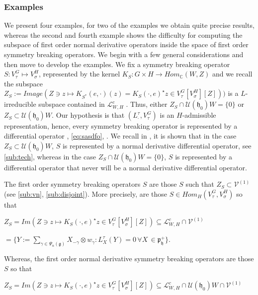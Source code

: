 \documentclass[12pt]{amsart}
\theoremstyle{definition}
\theoremstyle{remark}
\newcommand{\g}{\mathfrak{g}}
\newcommand{\h}{\mathfrak{h}}
\newcommand{\p}{\mathfrak p}
\numberwithin{equation}{section}
\begin{document}
\subsubsection{Examples}\label{sub:zs} We present four examples, for two of the examples we obtain quite precise results, whereas the second and fourth example shows the difficulty for computing the subspace of first order normal derivative operators inside the space of first order symmetry breaking operators. We begin with a few general considerations and then move to develop the examples. We fix  a symmetry breaking operator $S:V_\tau^G \mapsto V_\sigma^H$, represented by the kernel $K_S :G\times H \rightarrow Hom_\mathbb C( W, Z)$ and we recall  the subspace $Z_S:=Image(Z\ni z \mapsto K_{S^*}(e, \cdot) (z)=K_S(\cdot, e)^\star z \in V_\tau^G [V_\sigma^H][Z]))$ is a $L$-irreducible subspace contained in $\mathcal L_{W,H}^c$ \cite[Proposition 2.1]{OV3}. Thus, either $Z_S \cap \mathcal U(\mathfrak h_0)W=\{0\}$ or $Z_S \subset \mathcal U(\mathfrak h_0)W$. Our hypothesis is that $(L_\cdot^\tau, V_\tau^G)$ is an $H$-admissible representation, hence,  every symmetry breaking operator is represented by a differential operator  \cite{KP1}, \ref{eq:sasdfo},   \cite[Proposition 4.4]{OV2}. We recall in \cite[Proposition 6.1]{OV3}, it is shown that in the case  $Z_S \subset \mathcal U(\mathfrak h_0)W$,  $S$ is represented by a normal derivative differential operator, see \ref{sub:tech}, whereas in the   case $Z_S \cap \mathcal U(\mathfrak h_0)W=\{0\}$,  $S$ is represented by a differential operator   that never will be a normal derivative differential operator.

 The first order symmetry breaking operators $S$ are those $S$ such that $Z_S \subset \mathcal V^{(1)}$ (see \ref{sub:vn}, \ref{sub:disjoint}). More precisely, are those $S \in Hom_H(V_\tau^G, V_\sigma^H)$ so that

 $Z_S=Im(Z\ni z \mapsto  K_S(\cdot, e)^\star z \in V_\tau^G[V_\sigma^H][Z])
\subseteq \mathcal L_{W,H}^c \cap \mathcal V^{(1)}$

 \phantom{xxxxxxxxxxxx} $=\{ Y:=\sum_{\gamma \in \Psi_n(\g)} X_{-\gamma} \otimes w_\gamma : L_X^\tau(Y)=0 \, \forall X \, \in \p_\h^+ \}  $.

  Whereas, the first order normal derivative symmetry breaking operators are those $S$ so that

 $Z_S=Im(Z\ni z \mapsto  K_S(\cdot, e)^\star z \in V_\tau^G[V_\sigma^H][Z]) \subseteq \mathcal L_{W,H}^c \cap \mathcal U(\h_0)W \cap  \mathcal V^{(1)}$
\end{document}
